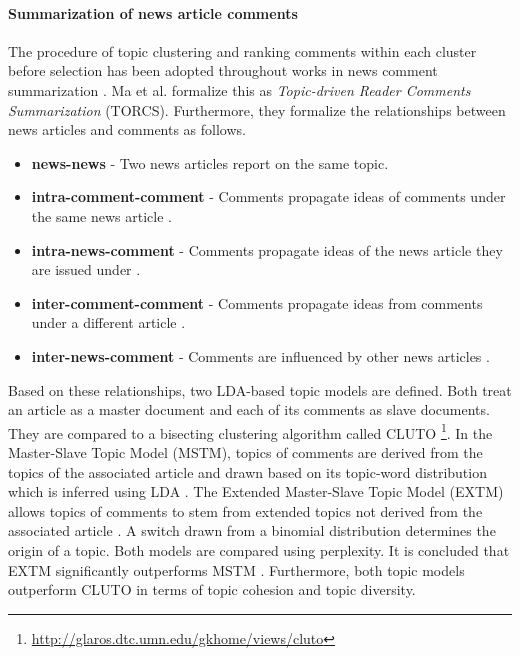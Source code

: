 \paragraph{Summarization of news article comments}
The procedure of topic clustering and ranking comments within each cluster before selection has been adopted throughout works in news comment summarization \cite{DBLP:conf/cikm/MaSYC12, llewellyn_grover_oberlander, DBLP:conf/ecir/AkerKBPBHG16, DBLP:conf/ecir/FunkABPHG17}. Ma et al. \cite{DBLP:conf/cikm/MaSYC12} formalize this as \textit{Topic-driven Reader Comments Summarization} (TORCS).
Furthermore, they formalize the relationships between news articles and comments as follows.
\begin{itemize}
\item \textbf{news-news} - Two news articles report on the same topic. \cite{DBLP:conf/cikm/MaSYC12}
\item \textbf{intra-comment-comment} - Comments propagate ideas of comments under the same news article \cite{DBLP:conf/cikm/MaSYC12}.
\item \textbf{intra-news-comment} - Comments propagate ideas of the news article they are issued under \cite{DBLP:conf/cikm/MaSYC12}.
\item \textbf{inter-comment-comment} \cite{DBLP:conf/cikm/MaSYC12} - Comments propagate ideas from comments under a different article \cite{DBLP:conf/cikm/MaSYC12}.
\item \textbf{inter-news-comment} - Comments are influenced by other news articles \cite{DBLP:conf/cikm/MaSYC12}.
\end{itemize}
Based on these relationships, two LDA-based topic models are defined. Both treat an article as a master document and each of its comments as slave documents. They are compared to a bisecting clustering algorithm called CLUTO \footnote{\url{http://glaros.dtc.umn.edu/gkhome/views/cluto}}. In the Master-Slave Topic Model (MSTM), topics of comments are derived from the topics of the associated article and drawn based on its topic-word distribution which is inferred using LDA \cite{DBLP:conf/cikm/MaSYC12}. The Extended Master-Slave Topic Model (EXTM) allows topics of comments to stem from extended topics not derived from the associated article \cite{DBLP:conf/cikm/MaSYC12}.
A switch drawn from a binomial distribution determines the origin of a topic. Both models are compared using perplexity. It is concluded that EXTM significantly outperforms MSTM \cite{DBLP:conf/cikm/MaSYC12}. Furthermore, both topic models outperform CLUTO in terms of topic cohesion and topic diversity.
